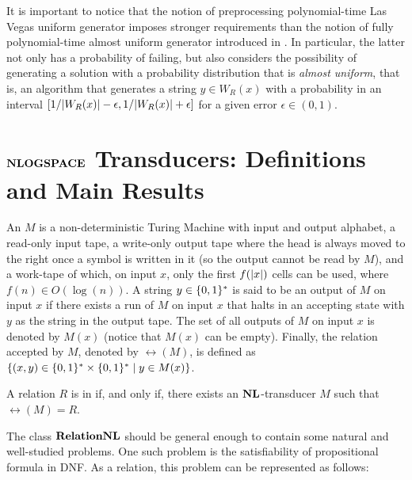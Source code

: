\documentclass[11pt,twoside=off,numbers=noenddot]{scrbook}
\begin{document}
It is important to notice that the notion of preprocessing polynomial-time Las Vegas uniform generator imposes stronger requirements than the notion of fully polynomial-time almost uniform generator introduced in \cite{jerrum1986random}. In particular, the latter not only has a probability of failing, but also considers the possibility of generating a solution with a probability distribution that is \emph{almost uniform}, that is, an algorithm that generates a string $y \in W_R(x)$ with a probability in an interval $[1 / | W_R(x) | - \epsilon, 1 / | W_R(x) | + \epsilon]$ for a given error $\epsilon \in (0, 1)$.

\chapter{$\textbf{NLOGSPACE}$ Transducers: Definitions and Main Results}
\begin{definition}[$\NL$-transducer]
    An  $M$ is a non-deterministic Turing Machine with input and output alphabet, a read-only input tape, a write-only output tape where the head is always moved to the right once a symbol is written in it (so the output cannot be read by $M$), and a work-tape of which, on input $x$, only the first $f(| x |)$ cells can be used, where $f(n) \in O(\log(n))$. A string $y \in \{ 0, 1 \}^\ast$ is said to be an output of $M$ on input $x$ if there exists a run of $M$ on input $x$ that halts in an accepting state with $y$ as the string in the output tape. The set of all outputs of $M$ on input $x$ is denoted by $M(x)$ (notice that $M(x)$ can be empty). Finally, the relation accepted by $M$, denoted by $\rel(M)$, is defined as $\{ (x, y) \in \{ 0, 1 \}^\ast \times \{ 0, 1 \}^\ast \mid y \in M(x) \}$.
\end{definition}

\begin{definition}[$\RelationNL$]
    A relation $R$ is in \vocab{$\RelationNL$} if, and only if, there exists an $\NL$-transducer $M$ such that $\rel(M) = R$.
\end{definition}

 

The class $\RelationNL$ should be general enough to contain some natural and well-studied problems. One such problem is the satisfiability of propositional formula in DNF. As a relation, this problem can be represented as follows:
\end{document}
